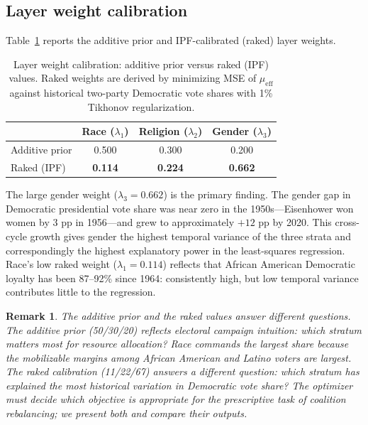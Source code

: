 \documentclass[12pt, letterpaper]{article}
\newtheorem{remark}{Remark}
\theoremstyle{definition}
\newcommand{\mueff}{\mu_{\mathrm{eff}}}
\newcommand{\lambdaone}{\lambda_1}
\newcommand{\lambdatwo}{\lambda_2}
\newcommand{\lambdathree}{\lambda_3}
\begin{document}
\subsection{Layer weight calibration}
\label{sec:raking_results}

Table~\ref{tab:raking} reports the additive prior and IPF-calibrated (raked)
layer weights.

\begin{table}[h]
\centering
\caption{Layer weight calibration: additive prior versus raked (IPF) values.
Raked weights are derived by minimizing MSE of $\mueff$ against historical
two-party Democratic vote shares with 1\% Tikhonov regularization.}
\label{tab:raking}
\begin{tabular}{lccc}
\toprule
 & Race ($\lambdaone$) & Religion ($\lambdatwo$) & Gender ($\lambdathree$) \\
\midrule
Additive prior   & 0.500 & 0.300 & 0.200 \\
Raked (IPF)      & \textbf{0.114} & \textbf{0.224} & \textbf{0.662} \\
\bottomrule
\end{tabular}
\end{table}

The large gender weight ($\lambdathree = 0.662$) is the primary finding.
The gender gap in Democratic presidential vote share was near zero in the
1950s---Eisenhower won women by 3 pp in 1956---and grew to approximately
$+12$ pp by 2020. This cross-cycle growth gives gender the highest temporal
variance of the three strata and correspondingly the highest explanatory power
in the least-squares regression. Race's low raked weight ($\lambdaone = 0.114$)
reflects that African American Democratic loyalty has been 87--92\% since 1964:
consistently high, but low temporal variance contributes little to the
regression.

\begin{remark}
The additive prior and the raked values answer different questions. The
additive prior (50/30/20) reflects electoral campaign intuition: which
stratum matters most for resource allocation? Race commands the largest share
because the mobilizable margins among African American and Latino voters are
largest. The raked calibration (11/22/67) answers a different question: which
stratum has explained the most historical variation in Democratic vote share?
The optimizer must decide which objective is appropriate for the prescriptive
task of coalition rebalancing; we present both and compare their outputs.
\end{remark}
\end{document}
